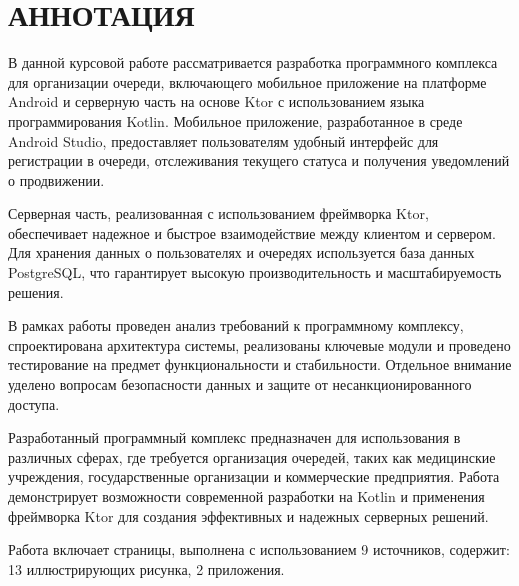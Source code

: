 \chapter*{АННОТАЦИЯ}

В данной курсовой работе рассматривается разработка программного комплекса
для организации очереди, включающего мобильное приложение на платформе Android
и серверную часть на основе Ktor с использованием языка программирования
Kotlin. Мобильное приложение, разработанное в среде Android Studio,
предоставляет пользователям удобный интерфейс для регистрации в очереди,
отслеживания текущего статуса и получения уведомлений о продвижении.\par
Серверная часть, реализованная с использованием фреймворка Ktor,
обеспечивает надежное и быстрое взаимодействие между клиентом и сервером.
Для хранения данных о пользователях и очередях используется база данных
PostgreSQL, что гарантирует высокую производительность
и масштабируемость решения.\par
В рамках работы проведен анализ требований к программному комплексу,
спроектирована архитектура системы, реализованы ключевые модули
и проведено тестирование на предмет функциональности и стабильности.
Отдельное внимание уделено вопросам безопасности данных
и защите от несанкционированного доступа.\par
Разработанный программный комплекс предназначен для использования
в различных сферах, где требуется организация очередей,
таких как медицинские учреждения, государственные организации
и коммерческие предприятия. Работа демонстрирует возможности современной
разработки на Kotlin и применения фреймворка Ktor
для создания эффективных и надежных серверных решений.\par
Работа включает \pageref{lastpage} страницы, выполнена с использованием 9
источников, содержит: 13 иллюстрирующих рисунка, 2 приложения.

